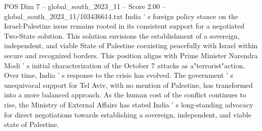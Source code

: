\begin{textsample}{POS Dim 7 – global\_south\_2023\_11 – Score 2.00 – global\_south\_2023\_11/103436614.txt}
India ' s foreign policy stance on the Israel-Palestine issue remains rooted in its consistent support for a negotiated Two-State solution.
This solution envisions the establishment of a sovereign, independent, and viable State of Palestine coexisting peacefully with Israel within secure and recognized borders.
This position aligns with Prime Minister Narendra Modi ' s initial characterization of the October 7 attacks as a"terrorist"action.
Over time, India ' s response to the crisis has evolved.
The government ' s unequivocal support for Tel Aviv, with no mention of Palestine, has transformed into a more balanced approach.
As the human cost of the conflict continues to rise, the Ministry of External Affairs has stated India ' s long-standing advocacy for direct negotiations towards establishing a sovereign, independent, and viable state of Palestine.

\end{textsample}
